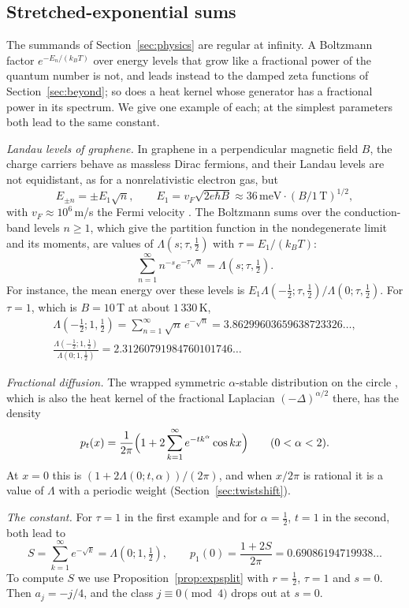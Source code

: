 \documentclass[11pt,reqno]{amsart}
\theoremstyle{definition}
\theoremstyle{remark}
\begin{document}
\subsection{Stretched-exponential sums}\label{sec:expsqrt}
The summands of Section~\ref{sec:physics} are regular at infinity. A Boltzmann factor $e^{-E_n/(k_BT)}$ over energy
levels that grow like a fractional power of the quantum number is not, and leads instead to the damped zeta functions
of Section~\ref{sec:beyond}; so does a heat kernel whose generator has a fractional power in its spectrum. We give one
example of each; at the simplest parameters both lead to the same constant.

\emph{Landau levels of graphene.} In graphene in a perpendicular magnetic field $B$, the charge carriers behave as
massless Dirac fermions, and their Landau levels are not equidistant, as for a nonrelativistic electron gas, but
\[
  E_{\pm n} = \pm E_1\sqrt n, \qquad E_1 = v_F\sqrt{2e\hbar B} \approx 36\,\mathrm{meV}\cdot(B/1\,\mathrm T)^{1/2},
\]
with $v_F \approx 10^6$\,m/s the Fermi velocity \cite{CGPNG09}. The Boltzmann sums over the conduction-band levels
$n \ge 1$, which give the partition function in the nondegenerate limit and its moments, are values of
$\Lambda(s;\tau,\frac12)$ with $\tau = E_1/(k_BT)$:
\[
  \sum_{n=1}^{\infty}n^{-s}e^{-\tau\sqrt n} = \Lambda(s;\tau,\tfrac12).
\]
For instance, the mean energy over these levels is $E_1\Lambda(-\frac12;\tau,\frac12)/\Lambda(0;\tau,\frac12)$. For
$\tau = 1$, which is $B = 10$\,T at about $1\,330$\,K,
\begin{gather*}
  \Lambda(-\tfrac12;1,\tfrac12) = \sum_{n=1}^{\infty}\sqrt n\,e^{-\sqrt n} = 3.86299603659638723326\ldots, \\
  \frac{\Lambda(-\frac12;1,\frac12)}{\Lambda(0;1,\frac12)} = 2.31260791984760101746\ldots
\end{gather*}

\emph{Fractional diffusion.} The wrapped symmetric $\alpha$-stable distribution on the circle \cite{MJ00}, which is
also the heat kernel of the fractional Laplacian $(-\Delta)^{\alpha/2}$ there, has the density
\[
  p_t(x) = \frac1{2\pi}\Bigl(1 + 2\sum_{k=1}^{\infty}e^{-tk^\alpha}\cos kx\Bigr) \qquad (0 < \alpha < 2).
\]
At $x = 0$ this is $(1 + 2\Lambda(0;t,\alpha))/(2\pi)$, and when $x/2\pi$ is rational it is a value of $\Lambda$ with
a periodic weight (Section~\ref{sec:twistshift}).

\emph{The constant.} For $\tau = 1$ in the first example and for $\alpha = \frac12$, $t = 1$ in the second, both lead to
\[
  S = \sum_{k=1}^{\infty}e^{-\sqrt k} = \Lambda(0;1,\tfrac12), \qquad p_1(0) = \frac{1+2S}{2\pi} = 0.69086194719938\ldots
\]
To compute $S$ we use Proposition~\ref{prop:expsplit} with $r = \frac12$, $\tau = 1$ and $s = 0$. Then $a_j = -j/4$, and the class $j \equiv 0 \pmod 4$ drops out at $s = 0$.
\end{document}
